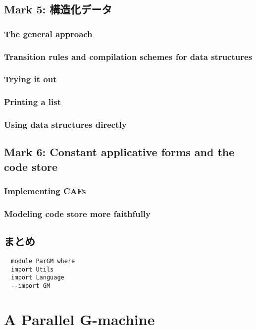 \documentclass{jarticle}
\begin{document}
\subsection{Mark 5: 構造化データ}
\subsubsection{The general approach}
\subsubsection{Transition rules and compilation schemes for data structures}
\subsubsection{Trying it out}
\subsubsection{Printing a list}
\subsubsection{Using data structures directly \dag}

\subsection{Mark 6: Constant applicative forms and the code store \dag}
\subsubsection{Implementing CAFs}
\subsubsection{Modeling code store more faithfully}

\subsection{まとめ}
\newpage

\begin{verbatim}
  module ParGM where
  import Utils
  import Language
  --import GM
\end{verbatim}
\newpage

\section{A Parallel G-machine}
\end{document}
